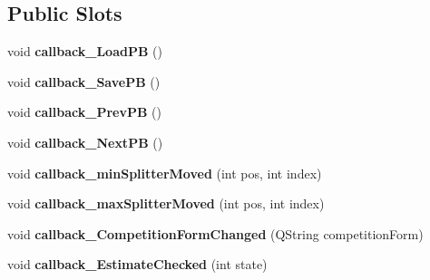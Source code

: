 \subsection*{Public Slots}
\begin{DoxyCompactItemize}
\item 
void {\bfseries callback\+\_\+\+Load\+PB} ()\hypertarget{classnmf_estimation___tab3_a576c64050facddb6c69e66900a37bf9b}{}\label{classnmf_estimation___tab3_a576c64050facddb6c69e66900a37bf9b}

\item 
void {\bfseries callback\+\_\+\+Save\+PB} ()\hypertarget{classnmf_estimation___tab3_a1e941f6d64899c4d6ebab2d1d968af95}{}\label{classnmf_estimation___tab3_a1e941f6d64899c4d6ebab2d1d968af95}

\item 
void {\bfseries callback\+\_\+\+Prev\+PB} ()\hypertarget{classnmf_estimation___tab3_a87f8f066b3eaf5c9029e574563e16ece}{}\label{classnmf_estimation___tab3_a87f8f066b3eaf5c9029e574563e16ece}

\item 
void {\bfseries callback\+\_\+\+Next\+PB} ()\hypertarget{classnmf_estimation___tab3_a1f24754398b1191bf71dce2ebb712700}{}\label{classnmf_estimation___tab3_a1f24754398b1191bf71dce2ebb712700}

\item 
void {\bfseries callback\+\_\+min\+Splitter\+Moved} (int pos, int index)\hypertarget{classnmf_estimation___tab3_ac8cba4aedbbda2501ea61de36b1daf68}{}\label{classnmf_estimation___tab3_ac8cba4aedbbda2501ea61de36b1daf68}

\item 
void {\bfseries callback\+\_\+max\+Splitter\+Moved} (int pos, int index)\hypertarget{classnmf_estimation___tab3_a59d5e1b5de967189037598d7bfb60022}{}\label{classnmf_estimation___tab3_a59d5e1b5de967189037598d7bfb60022}

\item 
void {\bfseries callback\+\_\+\+Competition\+Form\+Changed} (Q\+String competition\+Form)\hypertarget{classnmf_estimation___tab3_a10dfee72ed67b52afec72060531bfbb1}{}\label{classnmf_estimation___tab3_a10dfee72ed67b52afec72060531bfbb1}

\item 
void {\bfseries callback\+\_\+\+Estimate\+Checked} (int state)\hypertarget{classnmf_estimation___tab3_a42f31bad5e3e9377c671e6f58825c62f}{}\label{classnmf_estimation___tab3_a42f31bad5e3e9377c671e6f58825c62f}

\end{DoxyCompactItemize}
